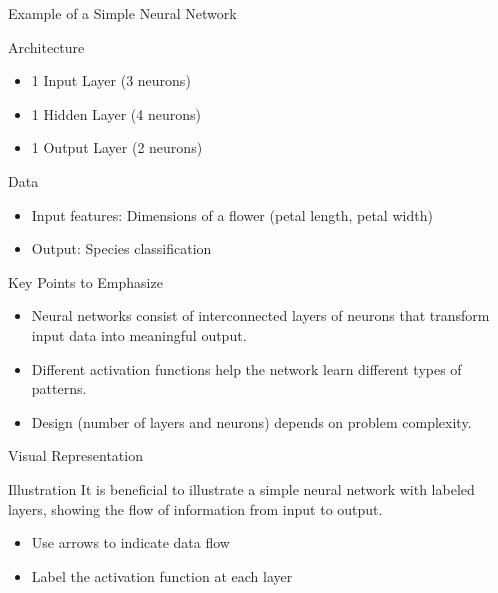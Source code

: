 \documentclass[aspectratio=169]{beamer}
\begin{document}
\begin{frame}[fragile]{Example of a Simple Neural Network}
    \begin{block}{Architecture}
        \begin{itemize}
            \item 1 Input Layer (3 neurons)
            \item 1 Hidden Layer (4 neurons)
            \item 1 Output Layer (2 neurons)
        \end{itemize}
    \end{block}
    \begin{block}{Data}
        \begin{itemize}
            \item Input features: Dimensions of a flower (petal length, petal width)
            \item Output: Species classification
        \end{itemize}
    \end{block}
\end{frame}

\begin{frame}[fragile]{Key Points to Emphasize}
    \begin{itemize}
        \item Neural networks consist of interconnected layers of neurons that transform input data into meaningful output.
        \item Different activation functions help the network learn different types of patterns.
        \item Design (number of layers and neurons) depends on problem complexity.
    \end{itemize}
\end{frame}

\begin{frame}[fragile]{Visual Representation}
    \begin{block}{Illustration}
        It is beneficial to illustrate a simple neural network with labeled layers, showing the flow of information from input to output.
    \end{block}
    \begin{itemize}
        \item Use arrows to indicate data flow
        \item Label the activation function at each layer
    \end{itemize}
\end{frame}
\end{document}
